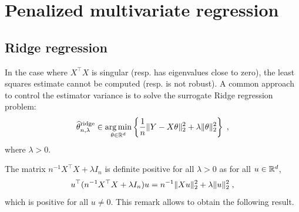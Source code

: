 \chapter{Penalized multivariate regression}
\minitoc


\section{Ridge regression}
In the case where $X^\top X$ is singular (resp. has eigenvalues close to zero), the least squares estimate cannot be computed (resp. is not robust). A common approach to control the estimator variance is to solve the surrogate Ridge regression problem:
\[
\widehat \param^{\mathrm{ridge}}_{n,\lambda}\in  \argmin_{\param\in\rset^d}  \left\{\frac{1}{n}\|Y - X\param\|_2^2 + \lambda\|\param\|_2^2\right\}\eqsp,
\]
where $\lambda>0$. 
\begin{remark}
The matrix $n^{-1}X^\top X + \lambda  I_n$ is definite positive for all $\lambda>0$ as for all $u\in\mathbb{R}^d$,
\[
u^\top (n^{-1}X^\top X + \lambda I_n)u = n^{-1}\|Xu\|_2^2 + \lambda  \|u\|_2^2\;,
\]
which is positive for all $u\neq 0$. This remark allows to obtain the following result.
\end{remark}

